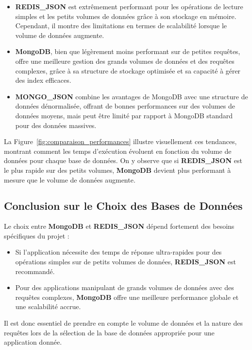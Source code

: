 \begin{itemize}
  \item \textbf{REDIS\_JSON} est extrêmement performant pour les opérations de lecture simples et les petits volumes de données grâce à son stockage en mémoire. Cependant, il montre des limitations en termes de scalabilité lorsque le volume de données augmente.
  \item \textbf{MongoDB}, bien que légèrement moins performant sur de petites requêtes, offre une meilleure gestion des grands volumes de données et des requêtes complexes, grâce à sa structure de stockage optimisée et sa capacité à gérer des index efficaces.
  \item \textbf{MONGO\_JSON} combine les avantages de MongoDB avec une structure de données dénormalisée, offrant de bonnes performances sur des volumes de données moyens, mais peut être limité par rapport à MongoDB standard pour des données massives.
\end{itemize}

La Figure~\ref{fig:comparaison_performances} illustre visuellement ces tendances, montrant comment les temps d'exécution évoluent en fonction du volume de données pour chaque base de données. On y observe que si \textbf{REDIS\_JSON} est le plus rapide sur des petits volumes, \textbf{MongoDB} devient plus performant à mesure que le volume de données augmente.

\subsection{Conclusion sur le Choix des Bases de Données}

Le choix entre \textbf{MongoDB} et \textbf{REDIS\_JSON} dépend fortement des besoins spécifiques du projet :

\begin{itemize}
  \item Si l'application nécessite des temps de réponse ultra-rapides pour des opérations simples sur de petits volumes de données, \textbf{REDIS\_JSON} est recommandé.
  \item Pour des applications manipulant de grands volumes de données avec des requêtes complexes, \textbf{MongoDB} offre une meilleure performance globale et une scalabilité accrue.
\end{itemize}

Il est donc essentiel de prendre en compte le volume de données et la nature des requêtes lors de la sélection de la base de données appropriée pour une application donnée.

